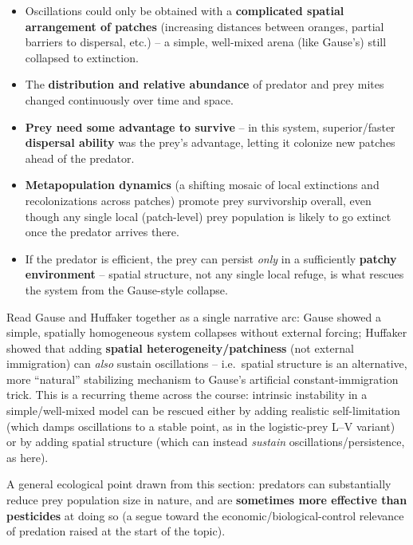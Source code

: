 \documentclass[11pt,a4paper]{article}
\begin{document}
\begin{keybox}[title=Huffaker's key findings]
\begin{itemize}[leftmargin=*]
\item Oscillations could only be obtained with a \textbf{complicated spatial arrangement of patches} (increasing distances between oranges, partial barriers to dispersal, etc.) -- a simple, well-mixed arena (like Gause's) still collapsed to extinction.
\item The \textbf{distribution and relative abundance} of predator and prey mites changed continuously over time and space.
\item \textbf{Prey need some advantage to survive} -- in this system, superior/faster \textbf{dispersal ability} was the prey's advantage, letting it colonize new patches ahead of the predator.
\item \textbf{Metapopulation dynamics} (a shifting mosaic of local extinctions and recolonizations across patches) promote prey survivorship overall, even though any single local (patch-level) prey population is likely to go extinct once the predator arrives there.
\item If the predator is efficient, the prey can persist \emph{only} in a sufficiently \textbf{patchy environment} -- spatial structure, not any single local refuge, is what rescues the system from the Gause-style collapse.
\end{itemize}
\end{keybox}

\begin{exambox}
Read Gause and Huffaker together as a single narrative arc: Gause showed a simple, spatially homogeneous system collapses without external forcing; Huffaker showed that adding \textbf{spatial heterogeneity/patchiness} (not external immigration) can \emph{also} sustain oscillations -- i.e.\ spatial structure is an alternative, more ``natural'' stabilizing mechanism to Gause's artificial constant-immigration trick. This is a recurring theme across the course: intrinsic instability in a simple/well-mixed model can be rescued either by adding realistic self-limitation (which damps oscillations to a stable point, as in the logistic-prey L--V variant) or by adding spatial structure (which can instead \emph{sustain} oscillations/persistence, as here).
\end{exambox}

A general ecological point drawn from this section: predators can substantially reduce prey population size in nature, and are \textbf{sometimes more effective than pesticides} at doing so (a segue toward the economic/biological-control relevance of predation raised at the start of the topic).
\end{document}

